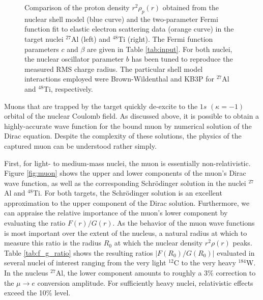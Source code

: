 \documentclass{book}[letterpaper,12pt]
\begin{document}
\begin{figure}
\centering
{}
\caption{Comparison of the proton density $r^2\rho_p(r)$ obtained from the nuclear shell model (blue curve) and the two-parameter Fermi function fit to elastic electron scattering data (orange curve) in the target nuclei $^{27}$Al (left) and $^{48}$Ti (right). The Fermi function parameters $c$ and $\beta$ are given in Table \ref{tab:input}. For both nuclei, the nuclear oscillator parameter $b$ has been tuned to reproduce the measured RMS charge radius. The particular shell model interactions employed were Brown-Wildenthal and KB3P for $^{27}$Al and $^{48}$Ti, respectively.}
\end{figure}

Muons that are trapped by the target quickly de-excite to the $1s$ $(\kappa=-1)$ orbital of the nuclear Coulomb field. As discussed above, it is possible to obtain a highly-accurate wave function for the bound muon by numerical solution of the Dirac equation. Despite the complexity of these solutions, the physics of the captured muon can be understood rather simply. 

First, for light- to medium-mass nuclei, the muon is essentially non-relativistic. Figure \ref{fig:muon} shows the upper and lower components of the muon's Dirac wave function, as well as the corresponding Schr\"odinger solution in the nuclei $^{27}$Al and $^{48}$Ti. For both targets, the Schr\"odinger solution is an excellent approximation to the upper component of the Dirac solution. Furthermore, we can appraise the relative importance of the muon's lower component by evaluating the ratio $F(r)/G(r)$. As the behavior of the muon wave functions is most important over the extent of the nucleus, a natural radius at which to measure this ratio is the radius $R_0$ at which the nuclear density $r^2\rho(r)$ peaks. Table \ref{tab:f_g_ratio} shows the resulting ratios $|F(R_0)/G(R_0)|$ evaluated in several nuclei of interest ranging from the very light $^{12}$C to the very heavy $^{184}$W. In the nucleus $^{27}$Al, the lower component amounts to roughly a $3\%$ correction to the $\mu\rightarrow e$ conversion amplitude. For sufficiently heavy nuclei, relativistic effects exceed the 10\% level. 
\end{document}
